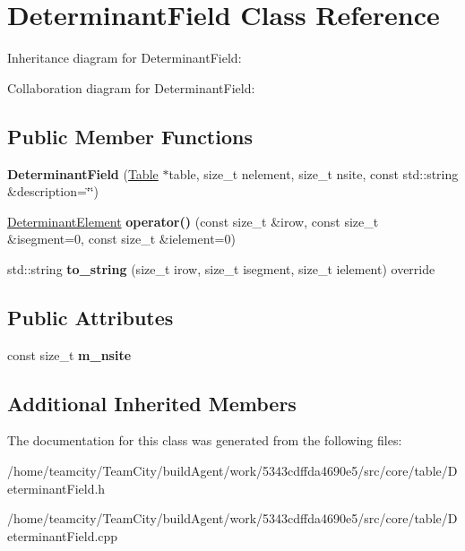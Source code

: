 \hypertarget{classDeterminantField}{}\section{Determinant\+Field Class Reference}
\label{classDeterminantField}


Inheritance diagram for Determinant\+Field\+:


Collaboration diagram for Determinant\+Field\+:
\subsection*{Public Member Functions}
\begin{DoxyCompactItemize}
\item 
{\bfseries Determinant\+Field} (\hyperlink{classTable}{Table} $\ast$table, size\+\_\+t nelement, size\+\_\+t nsite, const std\+::string \&description=\char`\"{}\char`\"{})\hypertarget{classDeterminantField_a4a78bd11b89a0791bea26e583e1771b4}{}\label{classDeterminantField_a4a78bd11b89a0791bea26e583e1771b4}

\item 
\hyperlink{classDeterminantElement}{Determinant\+Element} {\bfseries operator()} (const size\+\_\+t \&irow, const size\+\_\+t \&isegment=0, const size\+\_\+t \&ielement=0)\hypertarget{classDeterminantField_ae40d526423cefc0be2ba2f39b1ccd3db}{}\label{classDeterminantField_ae40d526423cefc0be2ba2f39b1ccd3db}

\item 
std\+::string {\bfseries to\+\_\+string} (size\+\_\+t irow, size\+\_\+t isegment, size\+\_\+t ielement) override\hypertarget{classDeterminantField_a6a3a2a1523d6f7a1d49e533be4298739}{}\label{classDeterminantField_a6a3a2a1523d6f7a1d49e533be4298739}

\end{DoxyCompactItemize}
\subsection*{Public Attributes}
\begin{DoxyCompactItemize}
\item 
const size\+\_\+t {\bfseries m\+\_\+nsite}\hypertarget{classDeterminantField_a8892acc9446867cf8a21f24ec4ce6b88}{}\label{classDeterminantField_a8892acc9446867cf8a21f24ec4ce6b88}

\end{DoxyCompactItemize}
\subsection*{Additional Inherited Members}


The documentation for this class was generated from the following files\+:\begin{DoxyCompactItemize}
\item 
/home/teamcity/\+Team\+City/build\+Agent/work/5343cdffda4690e5/src/core/table/Determinant\+Field.\+h\item 
/home/teamcity/\+Team\+City/build\+Agent/work/5343cdffda4690e5/src/core/table/Determinant\+Field.\+cpp\end{DoxyCompactItemize}
